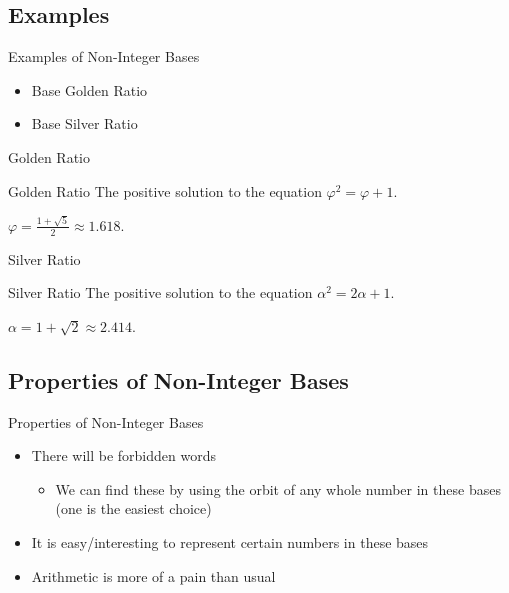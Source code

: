 \documentclass{beamer}
\begin{document}
\subsection{Examples}
\begin{frame}{Examples of Non-Integer Bases}
  \begin{itemize}
    \item Base Golden Ratio
    \item Base Silver Ratio
  \end{itemize}
\end{frame}

\begin{frame}{Golden Ratio}
  \begin{block}{Golden Ratio}
    The positive solution to the equation $\varphi^2 = \varphi + 1$.

    $\varphi = \frac{1+\sqrt{5}}{2} \approx 1.618$.
  \end{block}
\end{frame}

\begin{frame}{Silver Ratio}
  \begin{block}{Silver Ratio}
    The positive solution to the equation $\alpha^2 = 2\alpha + 1$.

    $\alpha = 1+\sqrt{2} \approx 2.414$.
  \end{block}
\end{frame}









\subsection{Properties of Non-Integer Bases}
\begin{frame}{Properties of Non-Integer Bases}
  \begin{itemize}
    \item There will be forbidden words
    \begin{itemize}
      \item We can find these by using the orbit of any whole number in these bases (one is the easiest choice)
    \end{itemize}
    \item It is easy/interesting to represent certain numbers in these bases
    \item Arithmetic is more of a pain than usual
  \end{itemize}
\end{frame}
\end{document}

